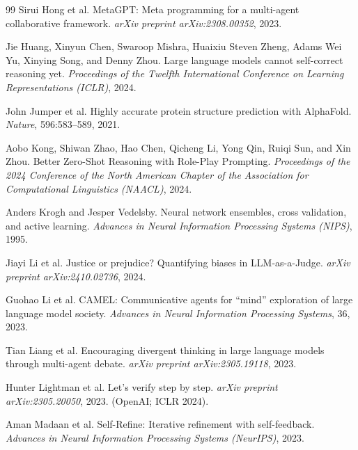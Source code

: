 \documentclass[11pt]{article}
\begin{document}
\begin{thebibliography}{99}
Sirui Hong et al.
\newblock MetaGPT: Meta programming for a multi-agent collaborative framework.
\newblock \emph{arXiv preprint arXiv:2308.00352}, 2023.

Jie Huang, Xinyun Chen, Swaroop Mishra, Huaixiu Steven Zheng, Adams Wei Yu, Xinying Song,
and Denny Zhou.
\newblock Large language models cannot self-correct reasoning yet.
\newblock \emph{Proceedings of the Twelfth International Conference on Learning
Representations (ICLR)}, 2024.

John Jumper et al.
\newblock Highly accurate protein structure prediction with AlphaFold.
\newblock \emph{Nature}, 596:583--589, 2021.

Aobo Kong, Shiwan Zhao, Hao Chen, Qicheng Li, Yong Qin, Ruiqi Sun, and Xin Zhou.
\newblock Better Zero-Shot Reasoning with Role-Play Prompting.
\newblock \emph{Proceedings of the 2024 Conference of the North American Chapter of the
Association for Computational Linguistics (NAACL)}, 2024.

Anders Krogh and Jesper Vedelsby.
\newblock Neural network ensembles, cross validation, and active learning.
\newblock \emph{Advances in Neural Information Processing Systems (NIPS)}, 1995.

Jiayi Li et al.
\newblock Justice or prejudice? Quantifying biases in LLM-as-a-Judge.
\newblock \emph{arXiv preprint arXiv:2410.02736}, 2024.

Guohao Li et al.
\newblock CAMEL: Communicative agents for ``mind'' exploration of large language model society.
\newblock \emph{Advances in Neural Information Processing Systems}, 36, 2023.

Tian Liang et al.
\newblock Encouraging divergent thinking in large language models through multi-agent debate.
\newblock \emph{arXiv preprint arXiv:2305.19118}, 2023.

Hunter Lightman et al.
\newblock Let's verify step by step.
\newblock \emph{arXiv preprint arXiv:2305.20050}, 2023.
\newblock (OpenAI; ICLR 2024).

Aman Madaan et al.
\newblock Self-Refine: Iterative refinement with self-feedback.
\newblock \emph{Advances in Neural Information Processing Systems (NeurIPS)}, 2023.


\end{thebibliography}
\end{document}
